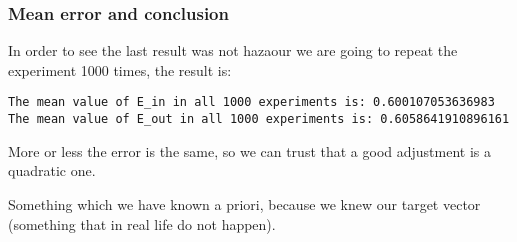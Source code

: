 \subsubsection{Mean error and conclusion}


In order to see the last result was not hazaour we are going to repeat the experiment 1000 times, the result is:


\begin{verbatim}
The mean value of E_in in all 1000 experiments is: 0.600107053636983
The mean value of E_out in all 1000 experiments is: 0.6058641910896161
\end{verbatim}

More or less the error is the same, so we can trust that a good adjustment is a quadratic one.

Something which we have known a priori, because we knew our target vector (something that in real life do not happen).

